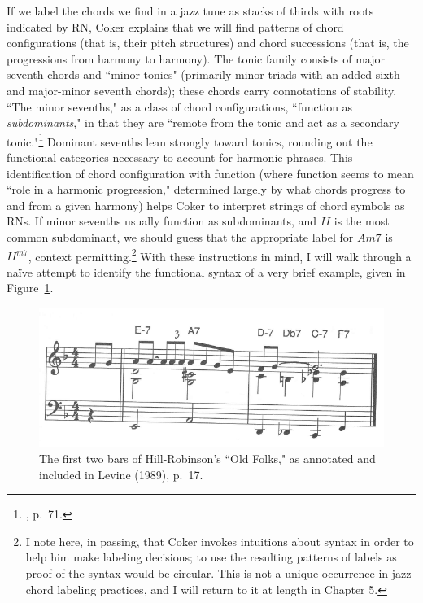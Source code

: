 If we label the chords we find in a jazz tune as stacks of thirds with roots indicated by RN, Coker explains that we will find patterns of chord configurations (that is, their pitch structures) and chord successions (that is, the progressions from harmony to harmony).  The tonic family consists of major seventh chords and ``minor tonics" (primarily minor triads with an added sixth and major-minor seventh chords); these chords carry connotations of stability.  ``The minor sevenths," as a class of chord configurations, ``function as \emph{subdominants}," in that they are ``remote from the tonic and act as a secondary tonic."\footnote{\cite{coker1964}, p.\ 71.}  Dominant sevenths lean strongly toward tonics, rounding out the functional categories necessary to account for harmonic phrases.  This identification of chord configuration with function (where function seems to mean ``role in a harmonic progression," determined largely by what chords progress to and from a given harmony) helps Coker to interpret strings of chord symbols as RNs.  If minor sevenths usually function as subdominants, and $II$ is the most common subdominant, we should guess that the appropriate label for $Am7$ is $II^{m7}$, context permitting.\footnote{I note here, in passing, that Coker invokes intuitions about syntax in order to help him make labeling decisions; to use the resulting patterns of labels as proof of the syntax would be circular.  This is not a unique occurrence in jazz chord labeling practices, and I will return to it at length in Chapter 5.}  With these instructions in mind, I will walk through a na\"{i}ve attempt to identify the functional syntax of a very brief example, given in Figure~\ref{levine_folks}.
\begin{figure}
	\centering
	\caption{The first two bars of Hill-Robinson's ``Old Folks," as annotated and included in Levine (1989), p.\ 17.}
	\label{levine_folks}
	\includegraphics[width=5in]{levine_31.png}
\end{figure}

